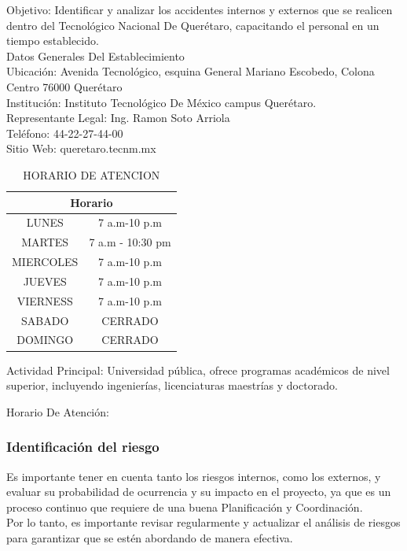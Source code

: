      Objetivo: Identificar y analizar los accidentes internos y externos que se realicen dentro del Tecnológico Nacional De Querétaro, capacitando el personal en un tiempo establecido.\\
    Datos Generales Del Establecimiento\\ 
    Ubicación: Avenida Tecnológico, esquina General Mariano Escobedo, Colona Centro 76000 Querétaro\\
    Institución: Instituto Tecnológico De México campus Querétaro.\\
    Representante Legal: Ing. Ramon Soto Arriola\\  
    Teléfono: 44-22-27-44-00\\ 
    Sitio Web: queretaro.tecnm.mx\\ 
    
    \begin{table}[h]
        \centering
        \caption{HORARIO DE ATENCION}
        \begin{tabular}{|c |c |}
        \hline
        \multicolumn{2}{c}{Horario}\\
        \hline
             LUNES& 7 a.m-10 p.m  \\
        \hline
             MARTES& 7 a.m - 10:30 pm\\
        \hline
             MIERCOLES& 7 a.m-10 p.m \\  
        \hline
             JUEVES& 7 a.m-10 p.m\\
        \hline
             VIERNESS& 7 a.m-10 p.m\\
        \hline
             SABADO& CERRADO\\
        \hline
             DOMINGO& CERRADO\\
        \hline     
        \end{tabular}
        \label{tab:riego}
    \end{table}
    
     
    
    Actividad Principal: Universidad pública, ofrece programas académicos de nivel superior, incluyendo ingenierías, licenciaturas maestrías y doctorado. 
    
     
    
    Horario De Atención:  
    \subsubsection{Identificación del riesgo}
    Es importante tener en cuenta tanto los riesgos internos, como los externos, y evaluar su probabilidad de ocurrencia y su impacto en el proyecto, ya que es un proceso continuo que requiere de una buena Planificación y Coordinación.\\
    Por lo tanto, es importante revisar regularmente y actualizar el análisis de riesgos para garantizar que se estén abordando de manera efectiva.
